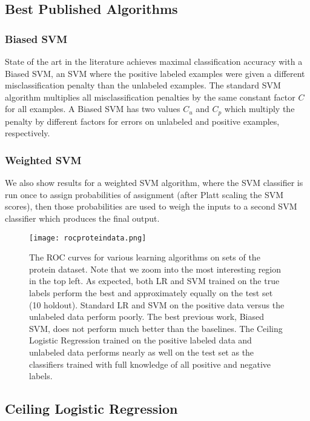 \documentclass{article}
\begin{document}
\subsection{Best Published Algorithms}

\subsubsection{Biased SVM}

State of the art in the literature \cite{elkan08} achieves maximal classification accuracy with a Biased SVM, an SVM where the positive labeled examples were given a different misclassification penalty than the unlabeled examples.  The standard SVM algorithm multiplies all misclassification penalties by the same constant factor $C$ for all examples. A Biased SVM has two values $C_u$ and $C_p$ which multiply the penalty by different factors for errors on unlabeled and positive examples, respectively.

\subsubsection{Weighted SVM}

We also show results for a weighted SVM algorithm, where the SVM classifier is run once to assign probabilities of assignment (after Platt scaling the SVM scores), then those probabilities are used to weigh the inputs to a second SVM classifier which produces the final output.

\begin{figure*}[ht!]
\vskip 0.2in
\begin{center}
\centerline{\texttt{[image: rocproteindata.png]}}
\caption{The ROC curves for various learning algorithms on sets of the protein dataset.  Note that we zoom into the most interesting region in the top left.  As expected, both LR and SVM trained on the true labels perform the best and approximately equally on the test set (10 holdout). Standard LR and SVM on the positive data versus the unlabeled data perform poorly.  The best previous work, Biased SVM, does not perform much better than the baselines.  The Ceiling Logistic Regression trained on the positive labeled data and unlabeled data performs nearly as well on the test set as the classifiers trained with full knowledge of all positive and negative labels.}
\label{roc}
\end{center}
\vskip -0.2in
\end{figure*}
\subsection{Ceiling Logistic Regression}
\end{document}
